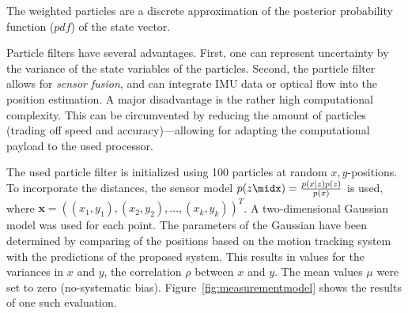 The weighted particles are a discrete approximation of the posterior
probability function ($pdf$) of the state vector.

Particle filters have several advantages. First, one can represent
uncertainty by the variance of the state variables of the
particles. Second, the particle filter allows for \emph{sensor fusion}, and
can integrate IMU data or optical flow into the position estimation.
A major disadvantage is the rather high computational complexity. This
can be circumvented by reducing the amount of particles (trading off
speed and accuracy)---allowing for adapting the computational payload
to the used processor.

The used particle filter is initialized using 100 particles at random
$x, y$-positions. To incorporate the distances, the sensor model $p(z
\midx) = \frac{p(x \mid z)p(z)}{p(x)}$ is used, where $\textbf{x} =
((x_1, y_1), (x_2, y_2), \ldots, (x_k, y_k))^T$. A two-dimensional
Gaussian model was used for each point. The parameters of the Gaussian
have been determined by comparing of the positions based on the motion
tracking system with the predictions of the proposed system. This
results in values for the variances in $x$ and $y$, the correlation
$\rho$ between $x$ and $y$. The mean values $\mu$ were set to zero
(no-systematic bias). Figure~\ref{fig:measurementmodel} shows the
results of one such evaluation.